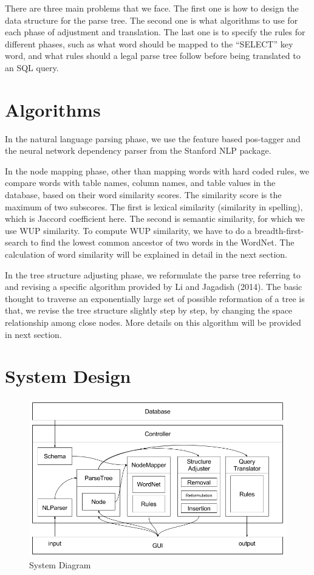 \documentclass[twocolumn]{article}
\begin{document}
There are three main problems that we face. The first one is how to design the data structure for the parse tree. The second one is what algorithms to use for each phase of adjustment and translation. The last one is to specify the rules for different phases, such as what word should be mapped to the ``SELECT'' key word, and what rules should a legal parse tree follow before being translated to an SQL query.

\section{Algorithms}

In the natural language parsing phase, we use the feature based pos-tagger\cite{toutanova2003feature} and the neural network dependency parser\cite{chen2014fast} from the Stanford NLP package.

In the node mapping phase, other than mapping words with hard coded rules, we compare words with table names, column names, and table values in the database, based on their word similarity scores. The similarity score is the maximum of two subscores. The first is lexical similarity (similarity in spelling), which is Jaccord coefficient here. The second is semantic similarity, for which we use WUP similarity\cite{wu1994verbs}. To compute WUP similarity, we have to do a breadth-first-search to find the lowest common ancestor of two words in the WordNet. The calculation of word similarity will be explained in detail in the next section.

In the tree structure adjusting phase, we reformulate the parse tree referring to and revising a specific algorithm provided by Li and Jagadish (2014)\cite{li2014}. The basic thought to traverse an exponentially large set of possible reformation of a tree is that, we revise the tree structure slightly step by step, by changing the space relationship among close nodes. More details on this algorithm will be provided in next section.

\section{System Design}

\begin{figure}[ht]
  \centering
  \includegraphics[width=0.8\linewidth]{figures/nlidb_system_diagram.png}
  \caption{System Diagram}
\end{figure}
\end{document}
